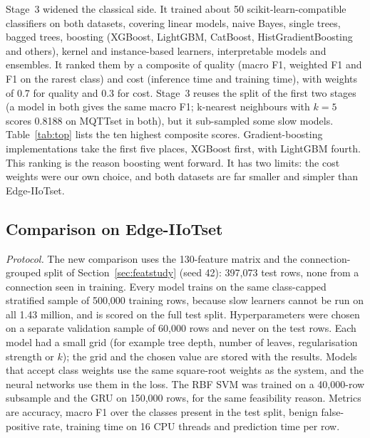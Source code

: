 Stage~3 widened the classical side. It trained about 50 scikit-learn-compatible classifiers on both datasets, covering linear models, naive Bayes, single trees, bagged trees, boosting (XGBoost, LightGBM, CatBoost, HistGradientBoosting and others), kernel and instance-based learners, interpretable models and ensembles. It ranked them by a composite of quality (macro F1, weighted F1 and F1 on the rarest class) and cost (inference time and training time), with weights of 0.7 for quality and 0.3 for cost. Stage~3 reuses the split of the first two stages (a model in both gives the same macro F1; k-nearest neighbours with $k=5$ scores 0.8188 on MQTTset in both), but it sub-sampled some slow models. Table~\ref{tab:top} lists the ten highest composite scores. Gradient-boosting implementations take the first five places, XGBoost first, with LightGBM fourth. This ranking is the reason boosting went forward. It has two limits: the cost weights were our own choice, and both datasets are far smaller and simpler than Edge-IIoTset.

\begin{table}[t]
\centering
\caption{Stage~3: ten best of 50 classical models by average composite score over MQTTset and DataSense (quality weight 0.7, cost weight 0.3).}
\label{tab:top}
\small

\end{table}

\subsection{Comparison on Edge-IIoTset}
\label{sec:zoo}
\textit{Protocol.} The new comparison uses the 130-feature matrix and the connection-grouped split of Section~\ref{sec:featstudy} (seed 42): 397,073 test rows, none from a connection seen in training. Every model trains on the same class-capped stratified sample of 500,000 training rows, because slow learners cannot be run on all 1.43 million, and is scored on the full test split. Hyperparameters were chosen on a separate validation sample of 60,000 rows and never on the test rows. Each model had a small grid (for example tree depth, number of leaves, regularisation strength or $k$); the grid and the chosen value are stored with the results. Models that accept class weights use the same square-root weights as the system, and the neural networks use them in the loss. The RBF SVM was trained on a 40,000-row subsample and the GRU on 150,000 rows, for the same feasibility reason. Metrics are accuracy, macro F1 over the classes present in the test split, benign false-positive rate, training time on 16 CPU threads and prediction time per row.

